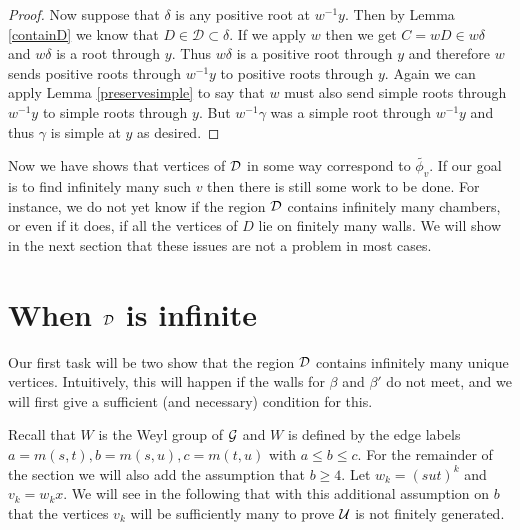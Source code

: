 \documentclass[class=book, crop=false,12 pt]{standalone}
\begin{document}
\begin{proof}
Now suppose that $\delta$ is any positive root at $w^{-1}y.$ Then by Lemma \ref{containD} we know that $D\in \mathcal{D}\subset \delta.$ If we apply $w$ then we get $C=wD\in w\delta$ and $w\delta$ is a root through $y.$ Thus $w\delta$ is a positive root through $y$ and therefore $w$ sends positive roots through $w^{-1}y$ to positive roots through $y.$ Again we can apply Lemma \ref{preservesimple} to say that $w$ must also send simple roots through $w^{-1}y$ to simple roots through $y.$ But $w^{-1}\gamma$ was a simple root through $w^{-1}y$ and thus $\gamma$ is simple at $y$ as desired.
%

\end{proof}

Now we have shows that vertices of $\mathcal{D}$ in some way correspond to $\tilde{\phi_v}.$ If our goal is to find infinitely many such $v$ then there is still some work to be done. For instance, we do not yet know if the region $\mathcal{D}$ contains infinitely many chambers, or even if it does, if all the vertices of $D$ lie on finitely many walls. We will show in the next section that these issues are not a problem in most cases.


\section{When $\mathcal{D}$ is infinite}
Our first task will be two show that the region $\mathcal{D}$ contains infinitely many unique vertices. Intuitively, this will happen if the walls for $\beta$ and $\beta'$ do not meet, and we will first give a sufficient (and necessary) condition for this.

Recall that $W$ is the Weyl group of $\mathcal{G}$ and $W$ is defined by the edge labels $a=m(s,t),b=m(s,u),c=m(t,u)$ with $a\le b \le c.$ For the remainder of the section we will also add the assumption that $b\ge 4.$ Let $w_k=(sut)^k$ and $v_k=w_kx.$ We will see in the following that with this additional assumption on $b$ that the vertices $v_k$ will be sufficiently many to prove $\mathcal{U}$ is not finitely generated.
\end{document}
